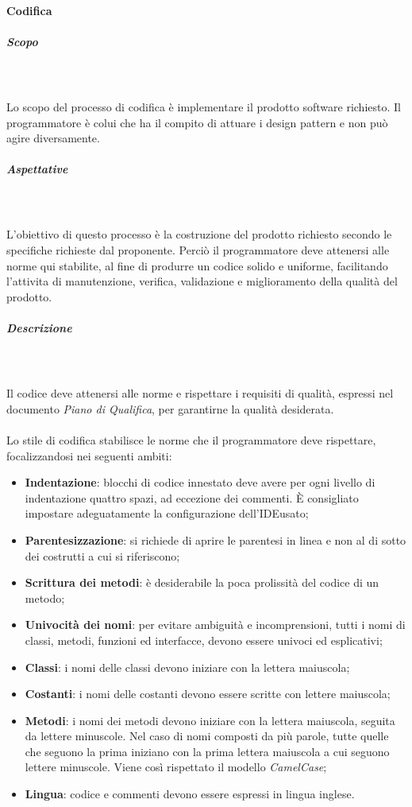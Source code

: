 	\paragraph{Codifica}
		\subparagraph*{Scopo}\mbox{} \\ \mbox{} \\
		Lo scopo del processo di codifica è implementare il prodotto software richiesto. Il programmatore è colui che ha il compito di attuare i design pattern e non può agire diversamente.
		\subparagraph*{Aspettative}\mbox{} \\ \mbox{} \\
		L'obiettivo di questo processo è la costruzione del prodotto richiesto secondo le specifiche richieste dal proponente. Perciò il programmatore deve attenersi alle norme qui stabilite, al fine di produrre un codice solido e uniforme, facilitando l'attivita di manutenzione, verifica, validazione e miglioramento della qualità del prodotto.
		\subparagraph*{Descrizione}\mbox{} \\ \mbox{} \\
		Il codice deve attenersi alle norme e rispettare i requisiti di qualità, espressi nel documento \textit{Piano di Qualifica}, per garantirne la qualità desiderata.
		 \mbox{} \\ \mbox{} \\
		Lo stile di codifica stabilisce le norme che il programmatore deve rispettare, focalizzandosi nei seguenti ambiti:
		\begin{itemize}
			\item \textbf{Indentazione}: blocchi di codice innestato deve avere per ogni livello di indentazione quattro spazi, ad eccezione dei commenti. È consigliato impostare adeguatamente la configurazione dell'IDE\glo usato;
			\item \textbf{Parentesizzazione}: si richiede di aprire le parentesi in linea e non al di sotto dei costrutti a cui si riferiscono;
			\item \textbf{Scrittura dei metodi}: è desiderabile la poca prolissità del codice di un metodo;
			\item \textbf{Univocità dei nomi}: per evitare ambiguità e incomprensioni, tutti i nomi di classi, metodi, funzioni ed interfacce, devono essere univoci ed esplicativi;
			\item \textbf{Classi}: i nomi delle classi devono iniziare con la lettera maiuscola;
			\item \textbf{Costanti}: i nomi delle costanti devono essere scritte con lettere maiuscola;
			\item \textbf{Metodi}: i nomi dei metodi devono iniziare con la lettera maiuscola, seguita da lettere minuscole. Nel caso di nomi composti da più parole, tutte quelle che seguono la prima iniziano con la prima lettera maiuscola a cui seguono lettere minuscole. Viene così rispettato il modello \textit{CamelCase}\glo;
			\item \textbf{Lingua}: codice e commenti devono essere espressi in lingua inglese.
		\end{itemize}
